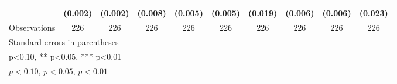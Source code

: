 \begin{table}[htbp]
\begin{tabular}{l*{9}{c}}
                    &     (0.002)         &     (0.002)         &     (0.008)         &     (0.005)         &     (0.005)         &     (0.019)         &     (0.006)         &     (0.006)         &     (0.023)         \\
\midrule
Observations        &         226         &         226         &         226         &         226         &         226         &         226         &         226         &         226         &         226         \\
\bottomrule
\multicolumn{10}{l}{\footnotesize Standard errors in parentheses}\\
\multicolumn{10}{l}{\footnotesize * p<0.10, ** p<0.05, *** p<0.01}\\
\multicolumn{10}{l}{\footnotesize \sym{*} \(p<0.10\), \sym{**} \(p<0.05\), \sym{***} \(p<0.01\)}\\
\end{tabular}
\end{table}
